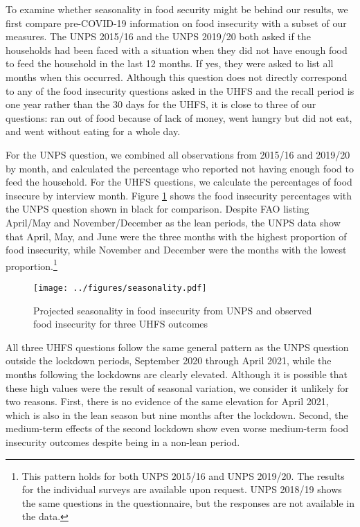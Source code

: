 \documentclass{wber}
\begin{document}
To examine whether seasonality in food security might be behind our
results, we first compare pre-COVID-19 information on food insecurity
with a subset of our measures. The UNPS 2015/16 and the UNPS 2019/20
both asked if the households had been faced with a situation when they
did not have enough food to feed the household in the last 12 months. If
yes, they were asked to list all months when this occurred. Although
this question does not directly correspond to any of the food insecurity
questions asked in the UHFS and the recall period is one year rather
than the 30 days for the UHFS, it is close to three of our questions:
ran out of food because of lack of money, went hungry but did not eat,
and went without eating for a whole day.

For the UNPS question, we combined all observations from 2015/16 and
2019/20 by month, and calculated the percentage who reported not having
enough food to feed the household. For the UHFS questions, we calculate
the percentages of food insecure by interview month.
Figure \ref{fig:seasonality} shows the food insecurity percentages with
the UNPS question shown in black for comparison. Despite FAO listing
April/May and November/December as the lean periods, the UNPS data show
that April, May, and June were the three months with the highest
proportion of food insecurity, while November and December were the
months with the lowest proportion.\footnote{This pattern holds for both
  UNPS 2015/16 and UNPS 2019/20. The results for the individual surveys
  are available upon request. UNPS 2018/19 shows the same questions in
  the questionnaire, but the responses are not available in the data.}

\begin{figure}
\centering
\texttt{[image: ../figures/seasonality.pdf]}
\caption{Projected seasonality in food insecurity from UNPS and observed
food insecurity for three UHFS outcomes}\label{fig:seasonality}
\end{figure}

All three UHFS questions follow the same general pattern as the UNPS
question outside the lockdown periods, September 2020 through April
2021, while the months following the lockdowns are clearly elevated.
Although it is possible that these high values were the result of
seasonal variation, we consider it unlikely for two reasons. First,
there is no evidence of the same elevation for April 2021, which is also
in the lean season but nine months after the lockdown. Second, the
medium-term effects of the second lockdown show even worse medium-term
food insecurity outcomes despite being in a non-lean period.
\end{document}
